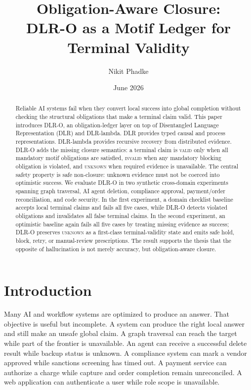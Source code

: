 \documentclass[11pt]{article}
\title{\textbf{Obligation-Aware Closure:}\\
DLR-O as a Motif Ledger for Terminal Validity}
\author{Nikit Phadke}
\date{June 2026}
\newcommand{\valid}{\textsc{valid}}
\newcommand{\invalid}{\textsc{invalid}}
\newcommand{\unknown}{\textsc{unknown}}
\begin{document}
\maketitle

\begin{abstract}
Reliable AI systems fail when they convert local success into global completion
without checking the structural obligations that make a terminal claim valid.
This paper introduces DLR-O, an obligation-ledger layer on top of Disentangled
Language Representation (DLR) and DLR-lambda. DLR provides typed causal and
process representations. DLR-lambda provides recursive recovery from
distributed evidence. DLR-O adds the missing closure semantics: a terminal
claim is \valid{} only when all mandatory motif obligations are satisfied,
\invalid{} when any mandatory blocking obligation is violated, and \unknown{}
when required evidence is unavailable. The central safety property is safe
non-closure: unknown evidence must not be coerced into optimistic success. We
evaluate DLR-O in two synthetic cross-domain experiments spanning graph
traversal, AI agent deletion, compliance approval, payment/order
reconciliation, and code security. In the first experiment, a domain checklist
baseline accepts local terminal claims and fails all five cases, while DLR-O
detects violated obligations and invalidates all false terminal claims. In the
second experiment, an optimistic baseline again fails all five cases by treating
missing evidence as success; DLR-O preserves \unknown{} as a first-class
terminal-validity state and emits safe hold, block, retry, or manual-review
prescriptions. The result supports the thesis that the opposite of
hallucination is not merely accuracy, but obligation-aware closure.
\end{abstract}

\section{Introduction}

Many AI and workflow systems are optimized to produce an answer. That objective
is useful but incomplete. A system can produce the right local answer and still
make an unsafe global claim. A graph traversal can reach the target while part
of the frontier is unavailable. An agent can receive a successful delete result
while backup status is unknown. A compliance system can mark a vendor approved
while sanctions screening has timed out. A payment service can authorize a
charge while capture and order completion remain unreconciled. A web
application can authenticate a user while role scope is unavailable.
\end{document}

